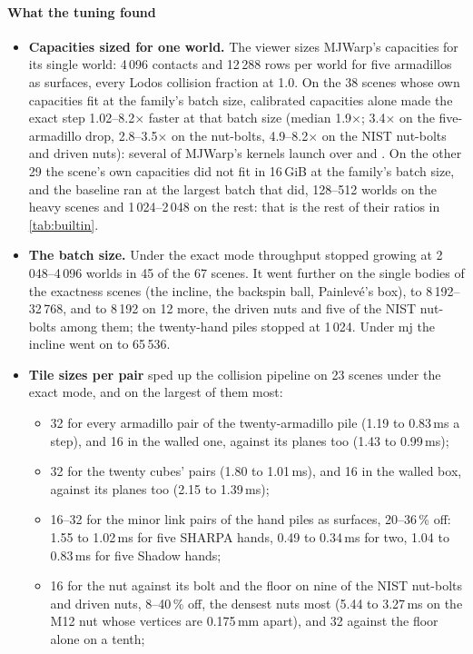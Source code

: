 \paragraph{What the tuning found}

\begin{itemize}
\item \textbf{Capacities sized for one world.} The viewer sizes MJWarp's capacities for its single world: 4\,096 contacts and 12\,288 rows per world for five armadillos as surfaces, every Lodos collision fraction at 1.0. On the 38 scenes whose own capacities fit at the family's batch size, calibrated capacities alone made the exact step 1.02--8.2$\times$ faster at that batch size (median 1.9$\times$; 3.4$\times$ on the five-armadillo drop, 2.8--3.5$\times$ on the nut-bolts, 4.9--8.2$\times$ on the NIST nut-bolts and driven nuts): several of MJWarp's kernels launch over  and . On the other 29 the scene's own capacities did not fit in 16\,GiB at the family's batch size, and the baseline ran at the largest batch that did, 128--512 worlds on the heavy scenes and 1\,024--2\,048 on the rest: that is the rest of their ratios in \cref{tab:builtin}.
\item \textbf{The batch size.} Under the exact mode throughput stopped growing at 2\,048--4\,096 worlds in 45 of the 67 scenes. It went further on the single bodies of the exactness scenes (the incline, the backspin ball, Painlev\'e's box), to 8\,192--32\,768, and to 8\,192 on 12 more, the driven nuts and five of the NIST nut-bolts among them; the twenty-hand piles stopped at 1\,024. Under mj the incline went on to 65\,536.
\item \textbf{Tile sizes per pair} sped up the collision pipeline on 23 scenes under the exact mode, and on the largest of them most:
  \begin{itemize}
  \item 32 for every armadillo pair of the twenty-armadillo pile (1.19 to 0.83\,ms a step), and 16 in the walled one, against its planes too (1.43 to 0.99\,ms);
  \item 32 for the twenty cubes' pairs (1.80 to 1.01\,ms), and 16 in the walled box, against its planes too (2.15 to 1.39\,ms);
  \item 16--32 for the minor link pairs of the hand piles as surfaces, 20--36\,\% off: 1.55 to 1.02\,ms for five SHARPA hands, 0.49 to 0.34\,ms for two, 1.04 to 0.83\,ms for five Shadow hands;
  \item 16 for the nut against its bolt and the floor on nine of the NIST nut-bolts and driven nuts, 8--40\,\% off, the densest nuts most (5.44 to 3.27\,ms on the M12 nut whose vertices are 0.175\,mm apart), and 32 against the floor alone on a tenth;

\end{itemize}
\end{itemize}
